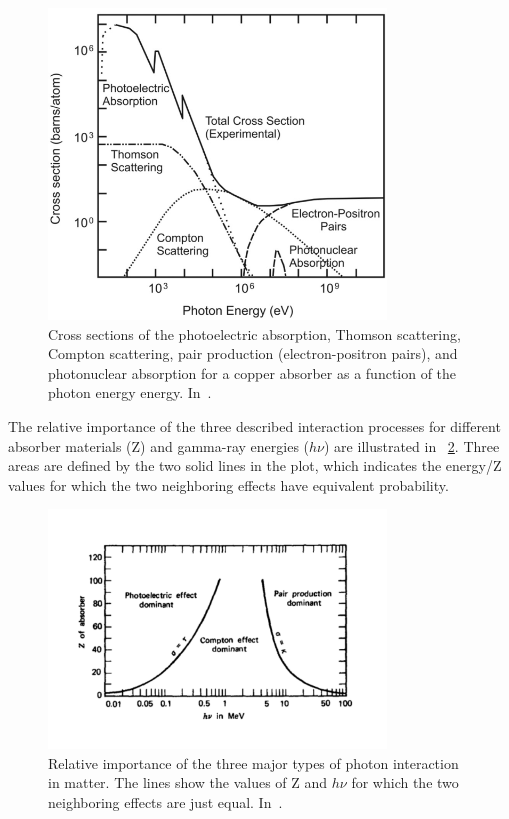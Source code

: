 \begin{figure}[!htbp]
\centering
\includegraphics[width=0.8\textwidth]{03_GraphicFiles/chapter2_GammaCameras/Photon-energy-dependent-cross-sections-Cross-sections-of-the-photoelectric-absorption.png}
\caption{Cross sections of the photoelectric absorption, Thomson scattering, Compton scattering, pair production (electron-positron pairs), and photonuclear absorption for a copper absorber as a function
of the photon energy energy. In~\cite{Hermanss2013}.}
\label{chap2::fig::photonCrossSec}
\end{figure} 

The relative importance of the three described interaction processes for different absorber materials (Z) and gamma-ray energies ($h\nu$) are illustrated in \figurename~\ref{chap2::fig::relativePhotonInt}. Three areas are defined by the two solid lines in the plot, which indicates the energy/Z values for which the two neighboring effects have equivalent probability. 
 
\begin{figure}[!htbp]
\centering
\includegraphics[width=0.8\textwidth]{03_GraphicFiles/chapter2_GammaCameras/RelativePhotonInt.pdf}
\caption{Relative importance of the three major types of photon interaction in matter. The lines show the values of Z and $h\nu$ for which the two neighboring effects are just equal. In~\cite{Knoll2000}.}
\label{chap2::fig::relativePhotonInt}
\end{figure} 


